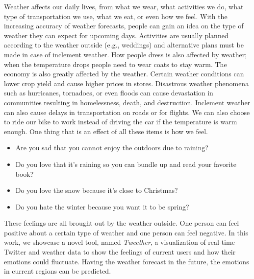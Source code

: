 \maketitle

Weather affects our daily lives, from what we wear, what activities we do, what type of transportation we use, what we eat, or even how we feel. With the increasing accuracy of weather forecasts, people can gain an idea on the type of weather they can expect for upcoming days. Activities are usually planned according to the weather outside (e.g., weddings) and alternative plans must be made in case of inclement weather. How people dress is also affected by weather; when the temperature drops people need to wear coats to stay warm. The economy is also greatly affected by the weather. Certain weather conditions can lower crop yield and cause higher prices in stores. Disastrous weather phenomena such as hurricanes, tornadoes, or even floods can cause devastation in communities resulting in homelessness, death, and destruction. Inclement weather can also cause delays in transportation on roads or for flights. We can also choose to ride our bike to work instead of driving the car if the temperature is warm enough. One thing that is an effect of all these items is how we feel.
\begin{itemize}
\vspace{-.1in}
\setlength{\topsep}{-0.1in}
\setlength{\itemsep}{-0.05in}
\item Are you sad that you cannot enjoy the outdoors due to raining?
\item Do you love that it's raining so you can bundle up and read your favorite book?
\item Do you love the snow because it's close to Christmas?
\item Do you hate the winter because you want it to be spring?
\end{itemize}
\vspace{-0.05in}
These feelings are all brought out by the weather outside. One person can feel positive about a certain type of weather and one person can feel negative. In this work, we showcase a novel tool, named \emph{Tweether}, a visualization of real-time Twitter and weather data to show the feelings of current users and how their emotions could fluctuate. Having the weather forecast %
in the future, the emotions in current regions can be predicted.

